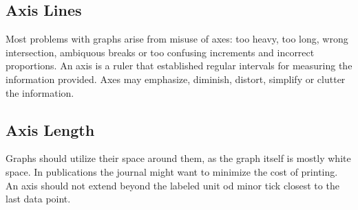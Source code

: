 \subsection{Axis Lines}

Most problems with graphs arise from misuse of axes: too heavy, too long, wrong intersection,
ambiquous breaks or too confusing increments and incorrect proportions. An axis is a ruler that established
regular intervals for measuring the information provided. Axes may emphasize, diminish, distort, simplify
or clutter the information.

\clearpage
\begin{multicols}{2}
\subsection{Axis Length}

Graphs should utilize their space around them, as the graph itself is mostly white space. In publications the journal might want to minimize the cost of printing. An axis should not extend beyond the labeled unit od minor tick closest to the last data point.
\columnbreak
{}
\end{multicols}













